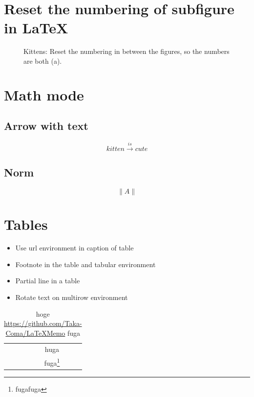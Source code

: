\documentclass{article}
\begin{document}
\section{Reset the numbering of subfigure in LaTeX}
\begin{figure}[h!]
	\centering
	\setcounter{subfigure}{0}
	\caption{
		Kittens: Reset the numbering in between the figures, 
		so the numbers are both (a).
	}
	\label{fig:fig1}
\end{figure}


\section{Math mode}

\subsection{Arrow with text}
\[kitten \xrightarrow{is} cute\]

\subsection{Norm}
\[\lVert A \rVert\]


\section{Tables}
\begin{itemize}
	\item Use url environment in caption of table
	\item Footnote in the table and tabular environment
	\item Partial line in a table
	\item Rotate text on multirow environment
\end{itemize}

\begin{table}[h!]
	\centering
	\caption{hoge \protect\url{https://github.com/Taka-Coma/LaTeXMemo} fuga}
	\begin{tabular}{|c|c|}
		\hline
		\multirow{2}{*}{\rotatebox[origin=c]{90}{hoge}} & huga \\
		\cline{2-2}
		 & fuga\footnote{fugafuga} \\
		\hline
	\end{tabular}
	\label{tab:table1}
\end{table}
\end{document}
